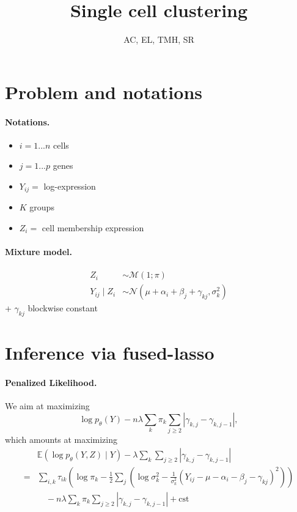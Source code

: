 \documentclass[a4paper, 11pt]{article}
\title{Single cell clustering}
\author{AC, EL, TMH, SR}
\newcommand{\cst}{\text{cst}}
\newcommand{\Esp}{\mathbb{E}}
\newcommand{\Mcal}{\mathcal{M}}
\newcommand{\Ncal}{\mathcal{N}}
\begin{document}
\maketitle

\section{Problem and notations}

\paragraph{Notations.}
\begin{itemize}
 \item $i = 1 ... n$ cells
 \item $j = 1 ... p$ genes
 \item $Y_{ij} =$ log-expression
 \item $K$ groups
 \item $Z_i =$ cell membership
 expression
\end{itemize}

\paragraph{Mixture model.}
\begin{align*}
 Z_i & \sim \Mcal(1; \pi) \\
 Y_{ij} \mid Z_i & \sim \Ncal(\mu + \alpha_i + \beta_j + \gamma_{kj}, \sigma_k^2)
\end{align*}
+ $\gamma_{kj}$ blockwise constant

\section{Inference via fused-lasso}

\paragraph{Penalized Likelihood.}
We aim at maximizing
$$
\log p_\theta(Y) - n \lambda \sum_k \pi_k \sum_{j\geq 2} |\gamma_{k,j} - \gamma_{k, j-1}|,
$$
which amounts at maximizing
\begin{align*}
 & \Esp \left(\log p_\theta(Y, Z)  \mid Y\right)- \lambda \sum_k \sum_{j\geq 2} |\gamma_{k,j} - \gamma_{k, j-1}| \\
 = & \sum_{i, k} \tau_{ik} \left(\log \pi_k - \frac12 \sum_j \left( \log\sigma^2_k - \frac1{\sigma^2_k} (Y_{ij} - \mu - \alpha_i - \beta_j - \gamma_{kj})^2 \right) \right) \\
 & \quad - n \lambda \sum_k \pi_k \sum_{j\geq 2} |\gamma_{k,j} - \gamma_{k, j-1}| + \cst
\end{align*}
\end{document}
